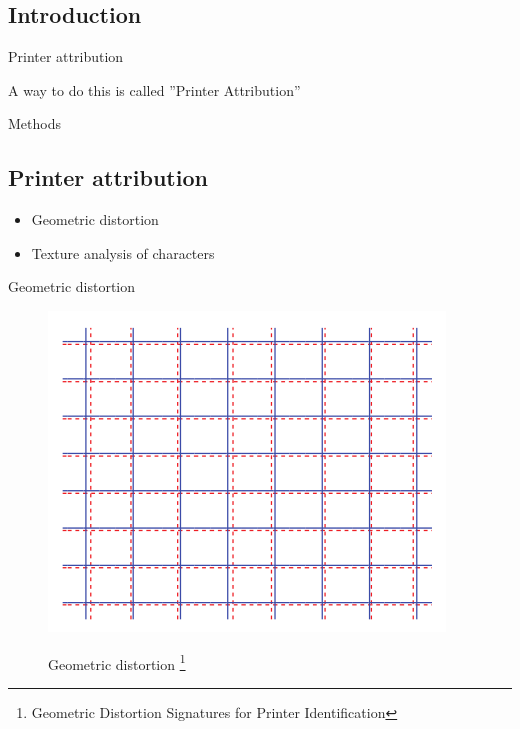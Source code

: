 \documentclass[notes]{beamer}
\begin{document}
\begin{frame}
\section{Introduction}
\begin{block}{Printer attribution}

A way to do this is called ''Printer Attribution''

\end{block}

\begin{block}{Methods}
\section{Printer attribution}
\begin{itemize}

\item Geometric distortion

\item Texture analysis of characters

\end{itemize}

\end{block}

\end{frame}

\begin{frame}

\begin{block}{Geometric distortion}

\begin{figure}[!htb]
\centering
\includegraphics[scale=0.35]{geometric_distortion}
\label{fig:geometric_distortion}
\caption{Geometric distortion \footnote{Geometric Distortion Signatures for Printer Identification\cite{Geometric_Distortion}}}
\end{figure}

\end{block}

{\let\thefootnote\relax\footnotetext{}}

\end{frame}
\end{document}

